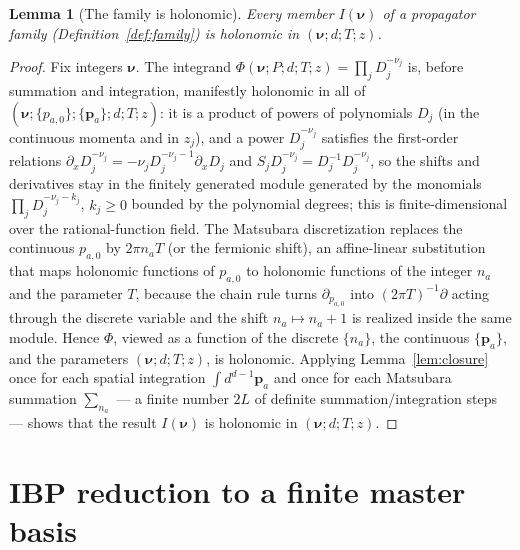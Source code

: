 \documentclass{amsart}
\newtheorem{lemma}{Lemma}
\theoremstyle{definition}
\begin{document}
\begin{lemma}[The family is holonomic]\label{lem:familyholo}
Every member $I(\boldsymbol\nu)$ of a propagator family
(Definition~\ref{def:family}) is holonomic in $(\boldsymbol\nu;d;T;z)$.
\end{lemma}

\begin{proof}
Fix integers $\boldsymbol\nu$. The integrand
$\Phi(\boldsymbol\nu;P;d;T;z)=\prod_j D_j^{-\nu_j}$ is, before summation and
integration, manifestly holonomic in all of
$(\boldsymbol\nu;\{p_{a,0}\};\{\mathbf p_a\};d;T;z)$: it is a product of
powers of polynomials $D_j$ (in the continuous momenta and in $z_j$), and a
power $D_j^{-\nu_j}$ satisfies the first-order relations
$\partial_{x}D_j^{-\nu_j}=-\nu_j D_j^{-\nu_j-1}\partial_x D_j$ and
$S_j D_j^{-\nu_j}=D_j^{-1}D_j^{-\nu_j}$, so the shifts and derivatives stay in
the finitely generated module generated by the monomials
$\prod_j D_j^{-\nu_j-k_j}$, $k_j\geq0$ bounded by the polynomial degrees; this
is finite-dimensional over the rational-function field. The Matsubara
discretization replaces the continuous $p_{a,0}$ by $2\pi n_a T$ (or the
fermionic shift), an affine-linear substitution that maps holonomic functions
of $p_{a,0}$ to holonomic functions of the integer $n_a$ and the parameter
$T$, because the chain rule turns $\partial_{p_{a,0}}$ into
$(2\pi T)^{-1}\partial$ acting through the discrete variable and the shift
$n_a\mapsto n_a+1$ is realized inside the same module. Hence $\Phi$, viewed as
a function of the discrete $\{n_a\}$, the continuous $\{\mathbf p_a\}$, and the
parameters $(\boldsymbol\nu;d;T;z)$, is holonomic. Applying
Lemma~\ref{lem:closure} once for each spatial integration
$\int d^{d-1}\mathbf p_a$ and once for each Matsubara summation $\sum_{n_a}$
--- a finite number $2L$ of definite summation/integration steps --- shows that
the result $I(\boldsymbol\nu)$ is holonomic in $(\boldsymbol\nu;d;T;z)$.
\end{proof}

\section{IBP reduction to a finite master basis}
\end{document}
